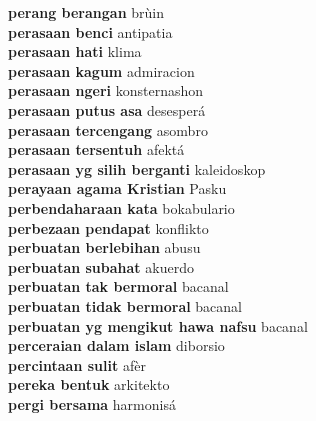 \textbf{ perang berangan  } brùin \\
\textbf{ perasaan benci  } antipatia \\
\textbf{ perasaan hati  } klima \\
\textbf{ perasaan kagum  } admiracion \\
\textbf{ perasaan ngeri  } konsternashon \\
\textbf{ perasaan putus asa  } desesperá \\
\textbf{ perasaan tercengang  } asombro \\
\textbf{ perasaan tersentuh  } afektá \\
\textbf{ perasaan yg silih berganti  } kaleidoskop \\
\textbf{ perayaan agama Kristian  } Pasku \\
\textbf{ perbendaharaan kata  } bokabulario \\
\textbf{ perbezaan pendapat  } konflikto \\
\textbf{ perbuatan berlebihan  } abusu \\
\textbf{ perbuatan subahat  } akuerdo \\
\textbf{ perbuatan tak bermoral  } bacanal \\
\textbf{ perbuatan tidak bermoral  } bacanal \\
\textbf{ perbuatan yg mengikut hawa nafsu  } bacanal \\
\textbf{ perceraian dalam islam  } diborsio \\
\textbf{ percintaan sulit  } afèr \\
\textbf{ pereka bentuk  } arkitekto \\
\textbf{ pergi bersama  } harmonisá \\
